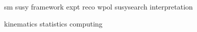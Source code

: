 \documentclass{mythesis}
\title{\mytitle}
\author{Alexander Sparrow}
\begin{document}


\begin{frontmatter}
  
\end{frontmatter}
\begin{mainmatter}
  \linenumbers
  
  {sm}
  {susy}
  {framework}
  {expt}
  {reco}
  {wpol}
  {susysearch}
  {interpretation}
  
  \nolinenumbers
\end{mainmatter}

\begin{comment}
  
  
  
  
  
  
  
  
\end{comment}

\begin{appendices}
  {kinematics}
  {statistics}
  {computing}
\end{appendices}

\begin{comment}
  
  
  
\end{comment}

\begin{backmatter}
  
\end{backmatter}

\end{document}

